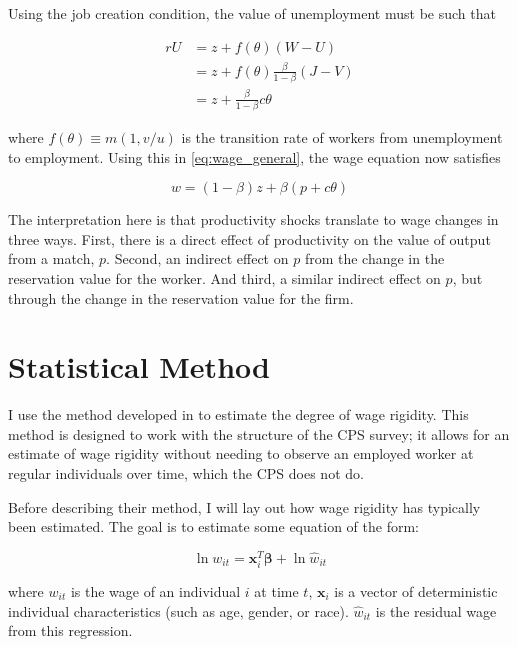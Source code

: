 \documentclass[11pt]{article}
\begin{document}
Using the job creation condition, the value of unemployment must be such that

\begin{align}
    rU &= z + f(\theta)(W - U)\\
       &= z + f(\theta)\frac{\beta}{1 - \beta}(J - V)\\
       &=z + \frac{\beta}{1 - \beta}c \theta
\end{align}

where $f(\theta) \equiv m(1, v/u)$ is the transition rate of workers from unemployment to employment.
Using this in \autoref{eq:wage_general}, the wage equation now satisfies

\begin{equation}
    w = (1 - \beta) z + \beta ( p + c \theta )
\end{equation}

The interpretation here is that productivity shocks translate to wage changes in three ways.
First, there is a direct effect of productivity on the value of output from a match, $p$.
Second, an indirect effect on $p$ from the change in the reservation value for the worker.
And third, a similar indirect effect on $p$, but through the change in the reservation value for the firm.


\section{Statistical Method}
\label{sec:statistical_method}

I use the method developed in \cite{haefke_sonntag_vanRens_2013} to estimate the degree of wage rigidity.
This method is designed to work with the structure of the CPS survey;
it allows for an estimate of wage rigidity without needing to observe an employed worker at regular individuals over time, which the CPS does not do.

Before describing their method, I will lay out how wage rigidity has typically been estimated.
The goal is to estimate some equation of the form:

\begin{equation}
    \label{eq:individual_wage}
    \ln w_{it} = \boldsymbol{x}_i^{T} \boldsymbol{\beta} + \ln \hat{w}_{it}
\end{equation}

where $w_{it}$ is the wage of an individual $i$ at time $t$, $\boldsymbol{x}_i$ is a vector of deterministic individual characteristics (such as age, gender, or race). $\hat{w}_{it}$ is the residual wage from this regression.
\end{document}
